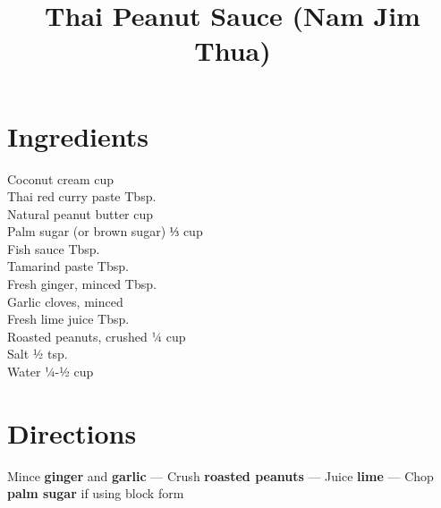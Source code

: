 \documentclass[11pt,letterpaper]{article}
\title{Thai Peanut Sauce (Nam Jim Thua)}
\author{}
\date{}
\begin{document}
\maketitle
\thispagestyle{empty}

\section*{Ingredients}
\setlength{\columnsep}{20pt}
\begin{multicols}{2}
\noindent
    Coconut cream  cup \\
    Thai red curry paste  Tbsp. \\
    Natural peanut butter  cup \\
    Palm sugar (or brown sugar) \dotfill ⅓ cup \\
    Fish sauce  Tbsp. \\
    Tamarind paste  Tbsp. \\
    \columnbreak
    Fresh ginger, minced  Tbsp. \\
    Garlic cloves, minced  \\
    Fresh lime juice  Tbsp. \\
    Roasted peanuts, crushed \dotfill ¼ cup \\
    Salt \dotfill ½ tsp. \\
    Water \dotfill ¼-½ cup \\
\end{multicols}

\section*{Directions}

\noindent
Mince \textbf{ginger} and \textbf{garlic} ---
Crush \textbf{roasted peanuts} ---
Juice \textbf{lime} ---
Chop \textbf{palm sugar} if using block form
\end{document}
